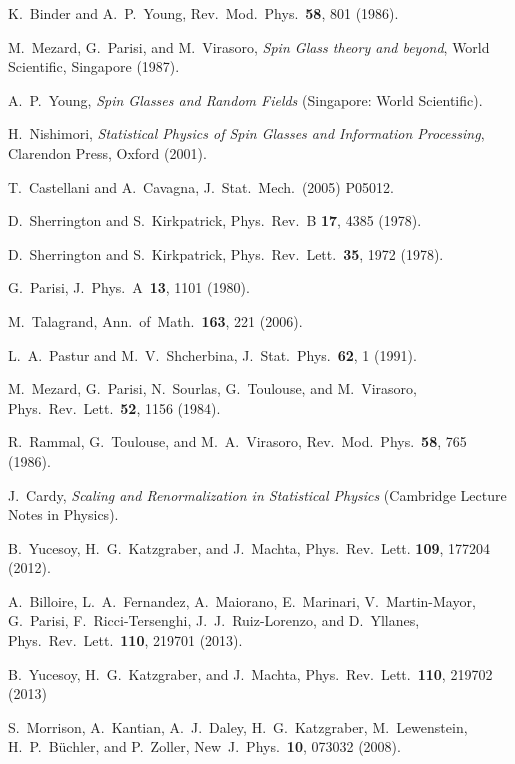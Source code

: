 \documentclass[twocolumn,superscriptaddress,prb,10pt]{revtex4-1}
\begin{document}
\begin{thebibliography}{99}
K.~Binder and A.~P.~Young, Rev.\ Mod.\ Phys.\ {\bf 58}, 801 (1986).

M.~Mezard, G.~Parisi, and M.~Virasoro, \emph{Spin Glass theory and beyond}, World Scientific, Singapore (1987).

A.~P.~Young, \emph{Spin Glasses and Random Fields} (Singapore: World Scientific).


H.~Nishimori, \emph{Statistical Physics of Spin Glasses and Information Processing}, 
Clarendon Press, Oxford (2001).

T.~Castellani and A.~Cavagna, J.\ Stat.\ Mech.\ (2005) P05012. 

D.~Sherrington and S.~Kirkpatrick, Phys.\ Rev.\ B {\bf 17}, 4385 
(1978).

D.~Sherrington and S.~Kirkpatrick, Phys.\ Rev.\ Lett.\ {\bf 35}, 
1972 (1978).

G.~Parisi, J.\ Phys.\ A\ {\bf 13}, 1101 (1980). 

M.~Talagrand, Ann.\ of\ Math.\ {\bf 163}, 221 (2006). 

L.~A.~Pastur and M.~V.~Shcherbina, J.\ Stat.\ Phys.\ {\bf 62}, 1 (1991).

M.~Mezard, G.~Parisi, N.~Sourlas, G.~Toulouse, and M.~Virasoro, 
Phys.\ Rev.\ Lett.\ {\bf 52}, 1156 (1984). 

R.~Rammal, G.~Toulouse, and M.~A.~Virasoro, Rev.\ Mod.\ Phys.\ {\bf 58}, 765 
(1986).

J.~Cardy, \emph{Scaling and Renormalization in Statistical Physics} 
(Cambridge Lecture Notes in Physics). 

B.~Yucesoy, H.~G.~Katzgraber, and J.~Machta, Phys.\ Rev.\ Lett. {\bf 109}, 
177204 (2012).

A.~Billoire, L.~A.~Fernandez, A.~Maiorano, E.~Marinari, 
V.~Martin-Mayor, G.~Parisi, F.~Ricci-Tersenghi, J.~J.~Ruiz-Lorenzo, 
and D.~Yllanes, Phys.\ Rev.\ Lett.\ {\bf 110}, 219701 (2013).

B.~Yucesoy, H.~G.~Katzgraber, and J.~Machta, Phys.\ Rev.\ Lett.\ {\bf 110}, 
219702 (2013)

S.~Morrison, A.~Kantian, A.~J.~Daley, H.~G.~Katzgraber, M.~Lewenstein, 
H.~P.~B\"uchler, and P.~Zoller, New\ J.\ Phys.\ {\bf 10}, 
073032 (2008). 


\end{thebibliography}
\end{document}
